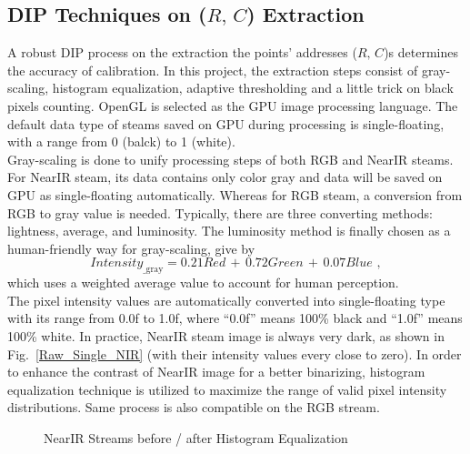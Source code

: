 \subsection{DIP Techniques on (\(R,\, C\)) Extraction}
\label{sectionDIPTechniques}
\indent
A robust DIP process on the extraction the points' addresses (\(R,\, C\))s determines the accuracy of calibration. In this project, the extraction steps consist of gray-scaling, histogram equalization, adaptive thresholding and a little trick on black pixels counting. OpenGL is selected as the GPU image processing language. The default data type of steams saved on GPU during processing is single-floating, with a range from 0 (balck) to 1 (white). 
\\\indent
Gray-scaling is done to unify processing steps of both RGB and NearIR steams. For NearIR steam, its data contains only color gray and data will be saved on GPU as single-floating automatically. Whereas for RGB steam, a conversion from RGB to gray value is needed. Typically, there are three converting methods: lightness, average, and luminosity. The luminosity method is finally chosen as a human-friendly way for gray-scaling, give by
%
\begin{equation}
Intensity_{\text{\_gray}} =  0.21 Red\,  + \, 0.72 Green \, + \, 0.07 Blue  \, \, ,
\label{luminosityGrayScaling}
\end{equation}%
which uses a weighted average value to account for human perception.
\\\indent%
The pixel intensity values are automatically converted into single-floating type with its range from 0.0f to 1.0f, where \enquote{0.0f} means 100\% black and \enquote{1.0f}  means 100\% white. In practice, NearIR steam image is always very dark, as shown in Fig.~\ref{Raw_Single_NIR} (with their intensity values every close to zero).  In order to enhance the contrast of NearIR image for a better binarizing, histogram equalization technique is utilized to maximize the range of valid pixel intensity distributions. Same process is also compatible on the RGB stream.
%
 \begin{figure}[t]
\hspace*{-0.5cm}
\centering
{}
\caption{NearIR Streams before / after Histogram Equalization}
\label{Histogram_Equalization}
\end{figure}%
